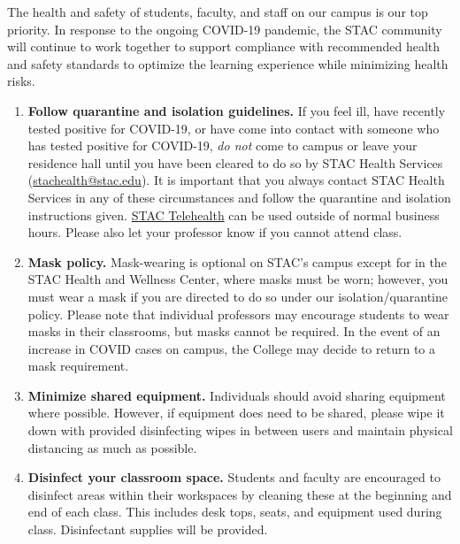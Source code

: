 \documentclass[11pt,letterpaper]{article}
\begin{document}
\newpage






The health and safety of students, faculty, and staff on our campus is our top priority. In response to the ongoing COVID-19 pandemic, the STAC community will continue to work together to support compliance with recommended health and safety standards to optimize the learning experience while minimizing health risks.  

	\begin{enumerate}[1.]
	\item {\bfseries Follow quarantine and isolation guidelines.} If you feel ill, have recently tested positive for COVID-19, or have come into contact with someone who has tested positive for COVID-19, {\itshape do not} come to campus or leave your residence hall until you have been cleared to do so by STAC Health Services (\href{mailto:stachealth@stac.edu}{stachealth@stac.edu}). It is important that you always contact STAC Health Services in any of these circumstances and follow the quarantine and isolation instructions given. \href{https://timely.md/schools/index.html?school=stac&}{STAC Telehealth} can be used outside of normal business hours. Please also let your professor know if you cannot attend class. 

	\item {\bfseries Mask policy.} Mask-wearing is optional on STAC’s campus except for in the STAC Health and Wellness Center, where masks must be worn; however, you must wear a mask if you are directed to do so under our isolation/quarantine policy. Please note that individual professors may encourage students to wear masks in their classrooms, but masks cannot be required. In the event of an increase in COVID cases on campus, the College may decide to return to a mask requirement. 

	\item {\bfseries Minimize shared equipment.} Individuals should avoid sharing equipment where possible. However, if equipment does need to be shared, please wipe it down with provided disinfecting wipes in between users and maintain physical distancing as much as possible.

	\item {\bfseries Disinfect your classroom space.} Students and faculty are encouraged to disinfect areas within their workspaces by cleaning these at the beginning and end of each class. This includes desk tops, seats, and equipment used during class. Disinfectant supplies will be provided. 


\end{enumerate}
\end{document}
